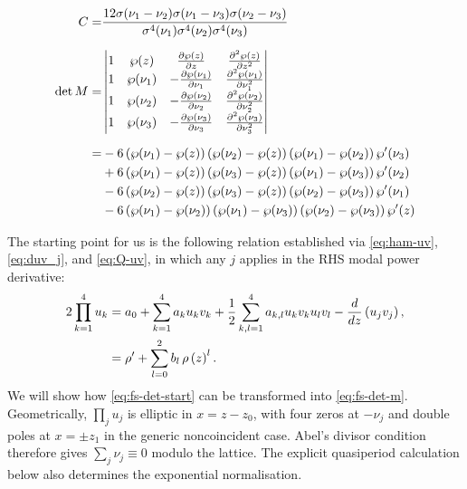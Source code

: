 \documentclass[11pt,a4paper]{article}
\numberwithin{equation}{section}
\begin{document}
\begin{align}
C = &\frac{12  \sigma{\left({\nu}_{1} - {\nu}_{2}\right)} \sigma{\left({\nu}_{1} - {\nu}_{3}\right)} \sigma{\left({\nu}_{2} - {\nu}_{3}\right)} }{\sigma^{4}{\left({\nu}_{1}\right)} \sigma^{4}{\left({\nu}_{2}\right)} \sigma^{4}{\left({\nu}_{3}\right)}} \\[6pt]
\det M = &
\begin{vmatrix}
1 & \wp(z) & \frac{\partial \wp(z)}{\partial z} & \frac{\partial^2 \wp(z)}{\partial z^2} \\
1 & \wp(\nu_1) & -\frac{\partial \wp(\nu_1)}{\partial \nu_1} & \frac{\partial^2 \wp(\nu_1)}{\partial \nu_1^2} \\
1 & \wp(\nu_2) & -\frac{\partial \wp(\nu_2)}{\partial \nu_2} & \frac{\partial^2 \wp(\nu_2)}{\partial \nu_2^2} \\
1 & \wp(\nu_3) & -\frac{\partial \wp(\nu_3)}{\partial \nu_3} & \frac{\partial^2 \wp(\nu_3)}{\partial \nu_3^2} \\
\end{vmatrix}  \notag \\[6pt]
= & - 6 \left(\wp{\left({\nu}_{1}\right)} - \wp{\left(z\right)}\right) \left(\wp{\left({\nu}_{2}\right)} - \wp{\left(z\right)}\right) \left(\wp{\left({\nu}_{1}\right)} - \wp{\left({\nu}_{2}\right)}\right) \wp'{\left({\nu}_{3}\right)} \notag \\
& + 6 \left(\wp{\left({\nu}_{1}\right)} - \wp{\left(z\right)}\right) \left(\wp{\left({\nu}_{3}\right)} - \wp{\left(z\right)}\right) \left(\wp{\left({\nu}_{1}\right)} - \wp{\left({\nu}_{3}\right)}\right) \wp'{\left({\nu}_{2}\right)}  \notag \\
& - 6 \left(\wp{\left({\nu}_{2}\right)} - \wp{\left(z\right)}\right) \left(\wp{\left({\nu}_{3}\right)} - \wp{\left(z\right)}\right) \left(\wp{\left({\nu}_{2}\right)} - \wp{\left({\nu}_{3}\right)}\right) \wp'{\left({\nu}_{1}\right)}  \notag \\
& - 6 \left(\wp{\left({\nu}_{1}\right)} - \wp{\left({\nu}_{2}\right)}\right) \left(\wp{\left({\nu}_{1}\right)} - \wp{\left({\nu}_{3}\right)}\right) \left(\wp{\left({\nu}_{2}\right)} - \wp{\left({\nu}_{3}\right)}\right) \wp'{\left(z\right)}
\end{align}

The starting point for us is the following relation established via \eqref{eq:ham-uv}, \eqref{eq:duv_j}, and \eqref{eq:Q-uv}, in which any $j$ applies in the RHS modal power derivative:
\begin{align}
2 \prod_{k=1}^{4} u_k &= {a}_{0} + \sum_{k=1}^{4} {a}_{k} u_k v_k  + \frac{1}{2}\sum\limits_{k,l=1}^{4} {a}_{k,l} u_k v_k u_l v_l - \frac{d}{d z}\left(u_j v_j\right), \notag \\
&=\rho' + \sum_{l=0}^{2}b_l\,\rho\left(z\right)^l. \label{eq:fs-det-start}
\end{align}
We will show how \eqref{eq:fs-det-start} can be transformed into \eqref{eq:fs-det-m}.
Geometrically, $\prod_j u_j$ is elliptic in $x=z-z_0$, with four zeros at $-\nu_j$ and double poles at $x=\pm z_1$ in the generic noncoincident case.
Abel's divisor condition therefore gives $\sum_j\nu_j\equiv0$ modulo the lattice.
The explicit quasiperiod calculation below also determines the exponential normalisation.
\end{document}
